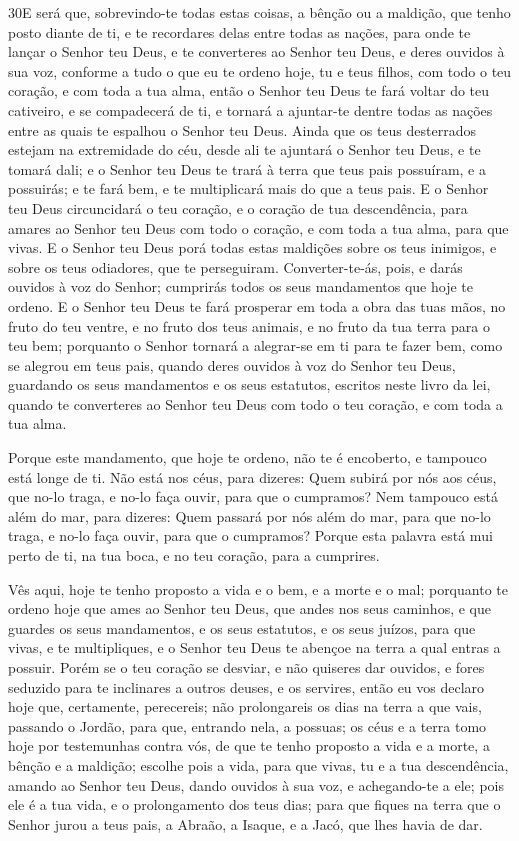 \medskip

\lettrine{30} E será que, sobrevindo-te todas estas coisas, a
bênção ou a maldição, que tenho posto diante de ti, e te recordares
delas entre todas as nações, para onde te lançar o Senhor teu Deus,
e te converteres ao Senhor teu Deus, e deres ouvidos à sua voz,
conforme a tudo o que eu te ordeno hoje, tu e teus filhos, com todo
o teu coração, e com toda a tua alma, então o Senhor teu Deus te
fará voltar do teu cativeiro, e se compadecerá de ti, e tornará a
ajuntar-te dentre todas as nações entre as quais te espalhou o
Senhor teu Deus. Ainda que os teus desterrados estejam na
extremidade do céu, desde ali te ajuntará o Senhor teu Deus, e te
tomará dali; e o Senhor teu Deus te trará à terra que teus pais
possuíram, e a possuirás; e te fará bem, e te multiplicará mais do
que a teus pais. E o Senhor teu Deus circuncidará o teu coração,
e o coração de tua descendência, para amares ao Senhor teu Deus com
todo o coração, e com toda a tua alma, para que vivas. E o
Senhor teu Deus porá todas estas maldições sobre os teus inimigos, e
sobre os teus odiadores, que te perseguiram. Converter-te-ás,
pois, e darás ouvidos à voz do Senhor; cumprirás todos os seus
mandamentos que hoje te ordeno. E o Senhor teu Deus te fará
prosperar em toda a obra das tuas mãos, no fruto do teu ventre, e no
fruto dos teus animais, e no fruto da tua terra para o teu bem;
porquanto o Senhor tornará a alegrar-se em ti para te fazer bem,
como se alegrou em teus pais, quando deres ouvidos à voz do
Senhor teu Deus, guardando os seus mandamentos e os seus estatutos,
escritos neste livro da lei, quando te converteres ao Senhor teu
Deus com todo o teu coração, e com toda a tua alma.

Porque este mandamento, que hoje te ordeno, não te é encoberto, e
tampouco está longe de ti. Não está nos céus, para dizeres:
Quem subirá por nós aos céus, que no-lo traga, e no-lo faça ouvir,
para que o cumpramos? Nem tampouco está além do mar, para
dizeres: Quem passará por nós além do mar, para que no-lo traga, e
no-lo faça ouvir, para que o cumpramos? Porque esta palavra
está mui perto de ti, na tua boca, e no teu coração, para a
cumprires.

Vês aqui, hoje te tenho proposto a vida e o bem, e a morte e o
mal; porquanto te ordeno hoje que ames ao Senhor teu Deus,
que andes nos seus caminhos, e que guardes os seus mandamentos, e os
seus estatutos, e os seus juízos, para que vivas, e te multipliques,
e o Senhor teu Deus te abençoe na terra a qual entras a possuir.
Porém se o teu coração se desviar, e não quiseres dar
ouvidos, e fores seduzido para te inclinares a outros deuses, e os
servires, então eu vos declaro hoje que, certamente,
perecereis; não prolongareis os dias na terra a que vais, passando o
Jordão, para que, entrando nela, a possuas; os céus e a terra
tomo hoje por testemunhas contra vós, de que te tenho proposto a
vida e a morte, a bênção e a maldição; escolhe pois a vida, para que
vivas, tu e a tua descendência, amando ao Senhor teu Deus,
dando ouvidos à sua voz, e achegando-te a ele; pois ele é a tua
vida, e o prolongamento dos teus dias; para que fiques na terra que
o Senhor jurou a teus pais, a Abraão, a Isaque, e a Jacó, que lhes
havia de dar.

